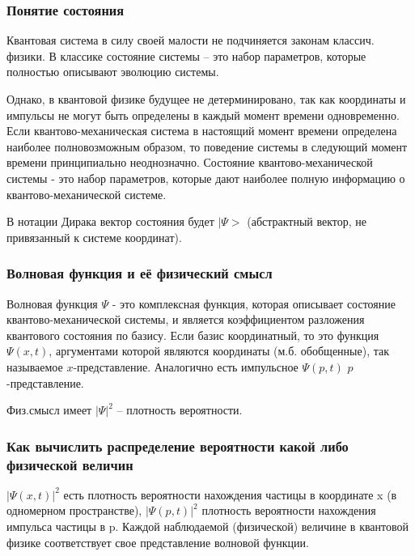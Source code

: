 
\subsubsection{Понятие состояния}\hypertarget{section}{}\label{section}

Квантовая система в силу своей малости не подчиняется законам классич. физики. В классике состояние системы -- это набор параметров, которые полностью описывают эволюцию системы.

Однако, в квантовой физике будущее не детерминировано, так как координаты и импульсы не могут быть определены в каждый момент времени одновременно. Если квантово-механическая система в настоящий момент времени определена наиболее полновозможным образом, то поведение системы в следующий момент времени принципиально неоднозначно. Состояние квантово-механической системы - это набор параметров, которые дают наиболее полную информацию о квантово-механической системе. 

В нотации Дирака вектор состояния будет $|\Psi>$ (абстрактный вектор, не привязанный к системе координат). 


\subsubsection{Волновая функция и её физический смысл}\hypertarget{section-1}{}\label{section-1}

Волновая функция $\Psi$ - это комплексная функция, которая описывает состояние квантово-механической системы, и является коэффициентом разложения квантового состояния по базису. Если базис координатный, то это функция $\Psi(x,t)$, аргументами которой являются координаты (м.б. обобщенные), так называемое \guillemotleft{}$x$-представление\guillemotright{}. Аналогично есть импульсное $\Psi(p,t)$ $p$-представление. 

Физ.смысл имеет $|\Psi|^2$ -- плотность вероятности. 


\subsubsection{Как вычислить распределение вероятности какой либо физической величин}\hypertarget{section-2}{}\label{section-2}

$|\Psi(x,t)|^2$ есть плотность вероятности нахождения частицы в координате x (в одномерном пространстве), $|\Psi(p,t)|^2$  плотность вероятности нахождения импульса частицы в p. Каждой наблюдаемой (физической) величине в квантовой физике соответствует свое представление волновой функции. 



